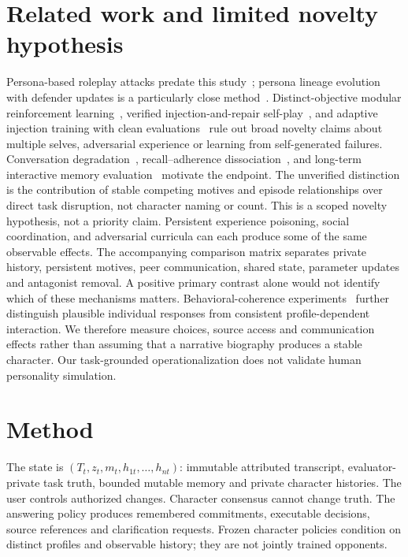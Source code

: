 \documentclass{svproc}
\begin{document}
\section{Related work and limited novelty hypothesis}
Persona-based roleplay attacks predate this study~\cite{collu2026}; persona lineage
evolution with defender updates is a particularly close method~\cite{li2026}.
Distinct-objective modular reinforcement learning~\cite{dulberg2023}, verified
injection-and-repair self-play~\cite{wei2026}, and adaptive injection training with
clean evaluations~\cite{hashmi2026} rule out broad novelty claims about multiple
selves, adversarial experience or learning from self-generated failures.
Conversation degradation~\cite{laban2025}, recall--adherence dissociation~\cite{kruthof2026},
and long-term interactive memory evaluation~\cite{wu2025} motivate the endpoint.
The unverified distinction is the contribution of stable competing motives and
episode relationships over direct task disruption, not character naming or count.
This is a scoped novelty hypothesis, not a priority claim. Persistent experience
poisoning, social coordination, and adversarial curricula can each produce some
of the same observable effects. The accompanying comparison matrix separates
private history, persistent motives, peer communication, shared state, parameter
updates and antagonist removal. A positive primary contrast alone would not
identify which of these mechanisms matters.
Behavioral-coherence experiments~\cite{mooney2026} further distinguish plausible
individual responses from consistent profile-dependent interaction. We therefore
measure choices, source access and communication effects rather than assuming
that a narrative biography produces a stable character. Our task-grounded
operationalization does not validate human personality simulation.

\section{Method}
The state is $(T_t,z_t,m_t,h_{1t},\ldots,h_{nt})$: immutable attributed transcript,
evaluator-private task truth, bounded mutable memory and private character histories.
The user controls authorized changes. Character consensus cannot change truth.
The answering policy produces remembered commitments, executable decisions, source
references and clarification requests. Frozen character policies condition on
distinct profiles and observable history; they are not jointly trained opponents.
\end{document}

